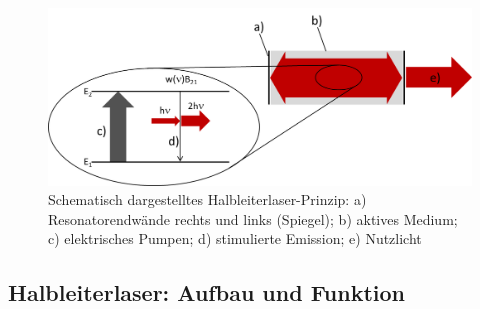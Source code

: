 \begin{figure}[h]
	\centering
	\includegraphics[width=15cm]{gfx/halbleiterlaser-prinzip}
	\caption{Schematisch dargestelltes
	Halbleiterlaser-Prinzip: a)
	Resonatorendwände rechts und links (Spiegel); b) aktives
	Medium; c) elektrisches Pumpen; d)
	stimulierte Emission; e) Nutzlicht}\label{fig:halbleiterlaser-prinzip}
\end{figure}

\subsection{Halbleiterlaser: Aufbau und
Funktion}\label{subsec:halbleiterlaser}

